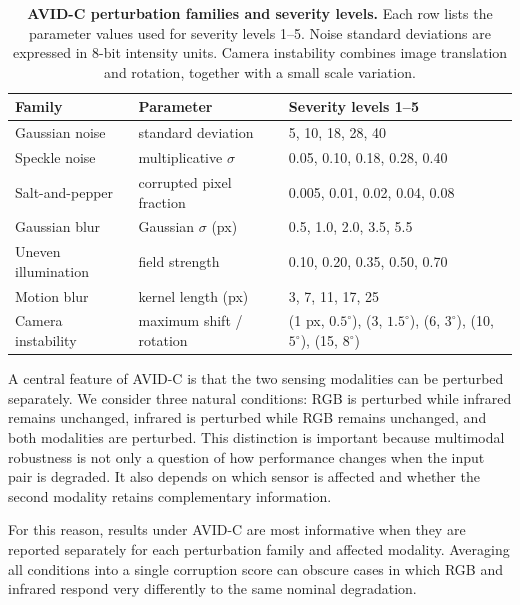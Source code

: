 \documentclass[10pt]{article}
\newcommand{\corrupt}{\textsc{AVID-C}}
\begin{document}
\begin{table}[t]
\centering
\caption{\textbf{\corrupt{} perturbation families and severity levels.}
Each row lists the parameter values used for severity levels 1--5. Noise standard deviations are expressed in 8-bit intensity units. Camera instability combines image translation and rotation, together with a small scale variation.}
\label{tab:corruptions}
\small
\begin{tabularx}{\linewidth}{@{}l l X@{}}
\toprule
Family & Parameter & Severity levels 1--5 \\
\midrule
Gaussian noise
& standard deviation
& 5, 10, 18, 28, 40 \\

Speckle noise
& multiplicative $\sigma$
& 0.05, 0.10, 0.18, 0.28, 0.40 \\

Salt-and-pepper
& corrupted pixel fraction
& 0.005, 0.01, 0.02, 0.04, 0.08 \\

Gaussian blur
& Gaussian $\sigma$ (px)
& 0.5, 1.0, 2.0, 3.5, 5.5 \\

Uneven illumination
& field strength
& 0.10, 0.20, 0.35, 0.50, 0.70 \\

Motion blur
& kernel length (px)
& 3, 7, 11, 17, 25 \\

Camera instability
& maximum shift / rotation
& (1 px, $0.5^\circ$), (3, $1.5^\circ$), (6, $3^\circ$),
  (10, $5^\circ$), (15, $8^\circ$) \\
\bottomrule
\end{tabularx}
\end{table}

A central feature of \corrupt{} is that the two sensing modalities can be perturbed separately. We consider three natural conditions: RGB is perturbed while infrared remains unchanged, infrared is perturbed while RGB remains unchanged, and both modalities are perturbed. This distinction is important because multimodal robustness is not only a question of how performance changes when the input pair is degraded. It also depends on which sensor is affected and whether the second modality retains complementary information.

For this reason, results under \corrupt{} are most informative when they are reported separately for each perturbation family and affected modality. Averaging all conditions into a single corruption score can obscure cases in which RGB and infrared respond very differently to the same nominal degradation.
\end{document}
